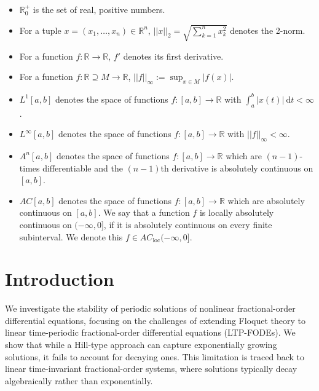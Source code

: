 \documentclass{svproc}
\newcommand{\realnumbers}{\mathbb{R}}
\newcommand{\realpositive}{\realnumbers_0^+}
\newcommand{\dsomething}[1]{\mathrm{d}#1}
\begin{document}
	\begin{itemize}[label=$\cdot$]
		\item $\realpositive$ is the set of real, positive numbers.
        \item {For a tuple $x = (x_1, \dots,x_n) \in \realnumbers^n$, $||x||_2 = \sqrt{\sum_{k=1}^n x_k^2}$ denotes the 2-norm.}
		\item For a function $f:\realnumbers\to\realnumbers$, $f'$ denotes its first derivative.
		\item For a function $f:\realnumbers\supseteq M \to \realnumbers$, $||f||_\infty := \sup_{x\in M} |f(x)|$.
		\item $L^1[a,b]$ denotes the space of functions $f:[a,b]\to\realnumbers$ with $\int_a^b|x(t)|~\dsomething{t}<\infty$.
		\item $L^\infty[a,b]$ denotes the space of functions $f:[a,b]\to\realnumbers$ with $||f||_\infty<\infty$.
		\item $A^n[a,b]$ denotes the space of functions $f:[a,b]\to \realnumbers$ which are $(n-1)$-times differentiable and the $(n-1)$th derivative is absolutely continuous on $[a,b]$.
        \item {$AC[a,b]$ denotes the space of functions $f:[a,b]\to \realnumbers$ which are absolutely continuous on $[a,b]$. We say that a function $f$ is locally absolutely continuous on $(-\infty,0]$, if it is absolutely continuous on every finite subinterval. We denote this $f\in AC_\mathrm{loc}(-\infty,0]$.}
	\end{itemize}
	\section{Introduction}
	{We investigate the stability of periodic solutions of nonlinear fractional-order differential equations, focusing on the challenges of extending Floquet theory to linear time-periodic fractional-order differential equations (LTP-FODEs). We show that while a Hill-type approach can capture exponentially growing solutions, it fails to account for decaying ones. This limitation is traced back to linear time-invariant fractional-order systems, where solutions typically decay algebraically rather than exponentially.
	}
	
\end{document}
